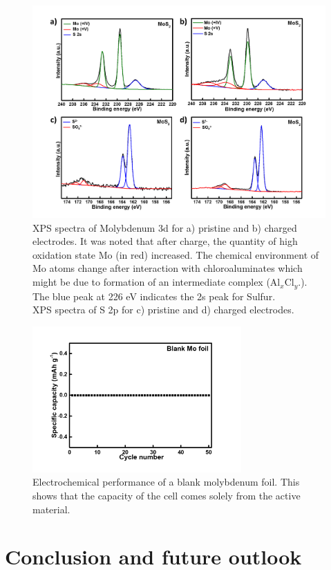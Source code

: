 \begin{figure}[htb!]
\centering
\includegraphics[width=\textwidth]{Figures/chap4fig/S7}
\caption{XPS spectra of Molybdenum 3d for a) pristine and b) charged  electrodes. It was noted that after charge, the quantity of high oxidation state Mo (in red) increased. The chemical environment of Mo atoms change after interaction with chloroaluminates which might be due to formation of an intermediate complex (Al$_x$Cl$_y$.). The blue peak at 226 eV indicates the 2s peak for Sulfur. \\XPS spectra of S 2p for c) pristine and d) charged  electrodes.}
\label{Figures/chap4fig:S7}
\end{figure}

\begin{figure}[htb!]
\centering
\includegraphics[width=8cm]{Figures/chap4fig/S8}
\caption{Electrochemical performance of a blank molybdenum foil. This shows that the capacity of the cell comes solely from the active material.}
\label{Figures/chap4fig:S8}
\end{figure}

\section{Conclusion and future outlook}


